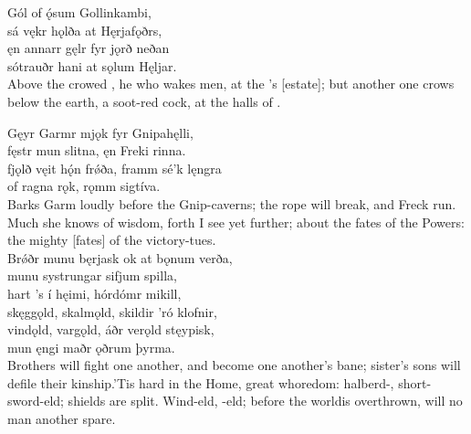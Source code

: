 \bva Gól of ǫ́sum \hld Gollinkambi, \\%
sá vękr hǫlða \hld at Hęrjafǫðrs, \\%
ęn annarr gęlr \hld fyr jǫrð neðan \\%
sótrauðr hani \hld at sǫlum Hęljar.\\%

\bvb Above the  crowed , he who wakes men, at the ’s [estate]; but another one crows below the earth, a soot-red cock, at the halls of .\footnotemark[1]\\%

\bva Gęyr Garmr mjǫk \hld fyr Gnipahęlli, \\%
fęstr mun slitna, \hld ęn Freki rinna. \\%
fjǫlð vęit hǫ́n frǿða, \hld framm sé’k lęngra \\%
of ragna rǫk, \hld rǫmm sigtíva.\\%

\bvb Barks Garm loudly before the Gnip-caverns; the rope will break, and Freck run. Much she knows of wisdom, forth I see yet further; about the fates of the Powers: the mighty [fates] of the victory-tues.\\%

\bva Brǿðr munu bęrjask \hld ok at bǫnum verða, \\%
munu systrungar \hld sifjum spilla, \\%
hart ’s í hęimi, \hld hórdómr mikill, \\%
skęggǫld, skalmǫld, \hld skildir ’ró klofnir, \\%
vindǫld, vargǫld, \hld áðr verǫld stęypisk, \\%
mun ęngi maðr \hld ǫðrum þyrma.\\%

\bvb Brothers will fight one another, and become one another’s bane; sister’s sons will defile their kinship.\footnotemark[1] ’Tis hard in the Home, great whoredom: halberd-, short-sword-eld; shields are split. Wind-eld, -eld; before the world\footnotemark[2] is overthrown, will no man another spare.\\%

